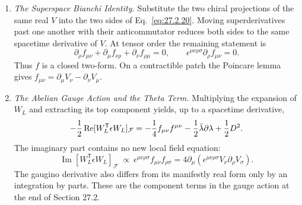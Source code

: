 \begin{enumerate}
  \begin{enumerate}
    \item \emph{The Superspace Bianchi Identity.}
    Substitute the two chiral projections of the same real \(V\) into the
      two sides of Eq.~\eqref{eq:27.2.20}.  Moving superderivatives past one
      another with their anticommutator reduces both sides to the same
      spacetime derivative of \(V\).  At tensor order the remaining statement
      is
      \[
        \partial_\rho f_{\mu\nu}
         +\partial_\mu f_{\nu\rho}
         +\partial_\nu f_{\rho\mu}=0,
        \qquad
        \epsilon^{\mu\nu\rho\sigma}\partial_\rho f_{\mu\nu}=0.
      \]
      Thus \(f\) is a closed two-form.  On a contractible patch the Poincare
      lemma gives
      \(f_{\mu\nu}=\partial_\mu V_\nu-\partial_\nu V_\mu\).
    \item \emph{The Abelian Gauge Action and the Theta Term.}
    Multiplying the expansion of \(W_L\) and extracting its top component
      yields, up to a spacetime derivative,
      \[
        -\frac12\operatorname{Re}
          [W_L^{\mathsf T}\epsilon W_L]_{\mathcal F}
          =-\frac14f_{\mu\nu}f^{\mu\nu}
           -\frac12\bar\lambda\sl{\partial}\lambda+\frac12D^2.
      \]
      The imaginary part contains no new local field equation:
      \[
        \operatorname{Im}
          [W_L^{\mathsf T}\epsilon W_L]_{\mathcal F}
          \ \propto\
          \epsilon^{\mu\nu\rho\sigma}f_{\mu\nu}f_{\rho\sigma}
          =4\partial_\mu\!
            \left(\epsilon^{\mu\nu\rho\sigma}
              V_\nu\partial_\rho V_\sigma\right).
      \]
      The gaugino derivative also differs from its manifestly real form only
      by an integration by parts.  These are the component terms in the
      gauge action at the end of Section 27.2.
  \end{enumerate}


\end{enumerate}
